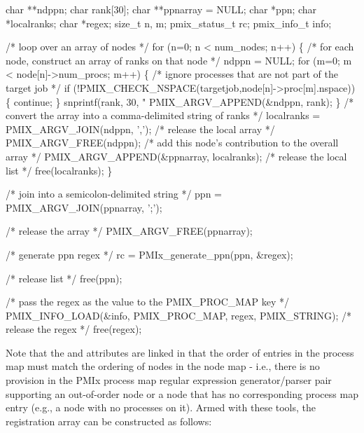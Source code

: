 \cspecificstart
\begin{codepar}
char **ndppn;
char rank[30];
char **ppnarray = NULL;
char *ppn;
char *localranks;
char *regex;
size_t n, m;
pmix_status_t rc;
pmix_info_t info;

/* loop over an array of nodes */
for (n=0; n < num_nodes; n++) \{
    /* for each node, construct an array of ranks on that node */
    ndppn = NULL;
    for (m=0; m < node[n]->num_procs; m++) \{
        /* ignore processes that are not part of the target job */
        if (!PMIX_CHECK_NSPACE(targetjob,node[n]->proc[m].nspace)) \{
            continue;
        \}
        snprintf(rank, 30, "%
        PMIX_ARGV_APPEND(&ndppn, rank);
    \}
    /* convert the array into a comma-delimited string of ranks */
    localranks = PMIX_ARGV_JOIN(ndppn, ',');
    /* release the local array */
    PMIX_ARGV_FREE(ndppn);
    /* add this node's contribution to the overall array */
    PMIX_ARGV_APPEND(&ppnarray, localranks);
    /* release the local list */
    free(localranks);
\}

/* join into a semicolon-delimited string */
ppn = PMIX_ARGV_JOIN(ppnarray, ';');

/* release the array */
PMIX_ARGV_FREE(ppnarray);

/* generate ppn regex */
rc = PMIx_generate_ppn(ppn, &regex);

/* release list */
free(ppn);

/* pass the regex as the value to the PMIX_PROC_MAP key */
PMIX_INFO_LOAD(&info, PMIX_PROC_MAP, regex, PMIX_STRING);
/* release the regex */
free(regex);
\end{codepar}
\cspecificend

Note that the  and  attributes are linked in that the order of entries in the process map must match the ordering of nodes in the node map - i.e., there is no provision in the \ac{PMIx} process map regular expression generator/parser pair supporting an out-of-order node or a node that has no corresponding process map entry (e.g., a node with no processes on it). Armed with these tools, the registration  array can be constructed as follows:

